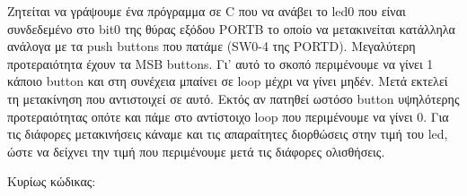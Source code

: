 \documentclass[a4paper,10pt]{article} \usepackage{anysize}
\begin{document}
Ζητείται να γράψουμε ένα πρόγραμμα σε C που να ανάβει το led0 που είναι
συνδεδεμένο στο bit0 της θύρας εξόδου PORTB το οποίο να μετακινείται κατάλληλα
ανάλογα με τα push buttons που πατάμε (SW0-4 της PORTD). Μεγαλύτερη
προτεραιότητα έχουν τα MSB buttons. Γι' αυτό το σκοπό περιμένουμε να γίνει 1
κάποιο button και στη συνέχεια μπαίνει σε loop μέχρι να γίνει μηδέν. Μετά
εκτελεί τη μετακίνηση που αντιστοιχεί σε αυτό. Εκτός αν πατηθεί ωστόσο button
υψηλότερης προτεραιότητας οπότε και πάμε στο αντίστοιχο loop που περιμένουμε
να γίνει 0. Για τις διάφορες μετακινήσεις κάναμε και τις απαραίτητες
διορθώσεις στην τιμή του led, ώστε να δείχνει την τιμή που περιμένουμε μετά
τις διάφορες ολισθήσεις.

\noindent Κυρίως κώδικας:
\inputminted[linenos,obeytabs,fontsize=\footnotesize]{c}{files/part3.c}
\end{document}
